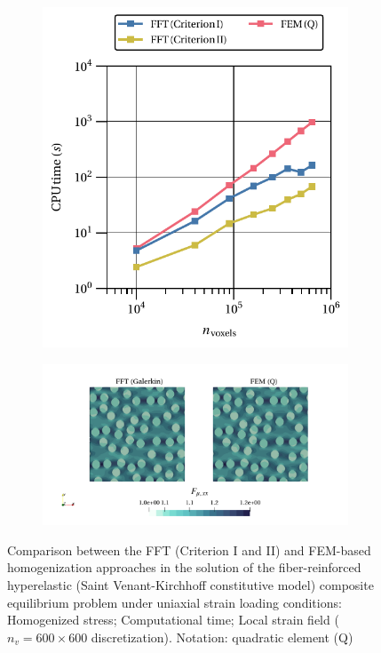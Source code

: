 \begin{figure}[hbt]
\begin{subfigure}[b]{0.49\textwidth}
    \includegraphics[width=\textwidth]{figures/svk_2D_normal_cpu_time_vs_n_voxels}
    \caption{}
    \label{subfig:svk_2D_normal_cpu_time_vs_n_voxels}
  \end{subfigure}
  \begin{subfigure}[b]{\textwidth}
    \centering
    \includegraphics[width=\textwidth]{figures/svk_2D_normal_strain_11}
    \caption{}
    \label{subfig:svk_2D_normal_strain_11}
  \end{subfigure}
  \caption{Comparison between the FFT (Criterion I and II) and FEM-based homogenization approaches in the
  solution of the fiber-reinforced hyperelastic (Saint Venant-Kirchhoff constitutive model) composite equilibrium problem under uniaxial strain loading conditions:
   Homogenized stress;
   Computational time;
   Local strain field (\(n_v = 600 \times 600\)
  discretization). Notation: quadratic element (Q)}
\label{fig:svk_2D_normal}
\end{figure}

